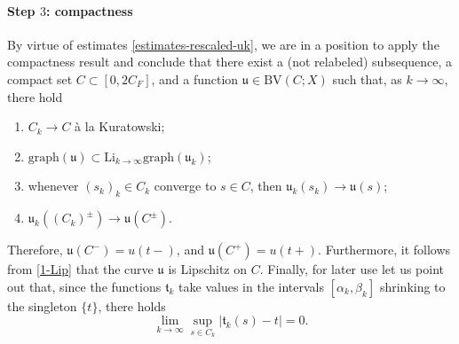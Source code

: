 \documentclass[a4paper,10pt,reqno]{amsart} %
\numberwithin{equation}{section}
\newcommand{\Xs}{X}
\newcommand{\BV}{\mathrm{BV}}
\newcommand{\lli}[2]{{#1}({#2}{-})}
\newcommand{\rli}[2]{{#1}({#2}{+})}
\newcommand{\ninvresc}[1]{\mathfrak{t}_{#1}}
\newcommand{\invcur}[1]{\mathfrak{u}_{#1}}
\newcommand{\invcu}{\mathfrak{u}}
\newcommand{\RRRN}{\color{blue}}
\begin{document}
\paragraph{\bf Step $3$: compactness} By virtue of estimates \eqref{estimates-rescaled-uk}, we are in a position to apply the 
compactness result  \cite[Thm.\ 5.4]{SavMin16} and conclude that 
 there exist a (not relabeled) subsequence,  a compact set   $C\subset [0,2C_F]$,
  and a function $\invcu \in \BV(C;\Xs)$ such that, as $k\to\infty$, there hold
\begin{enumerate}
\item $C_{k} \to C$ \`a la Kuratowski;
\item $\mathrm{graph}(\invcu)\subset \mathrm{Li}_{k\to\infty} \mathrm{graph}(\invcur {k})$;
\item whenever $(s_{k})_k  \in C_{k}$ converge to $s\in C$, then $\invcur {k}(s_{k})\to \invcu(s)$;
\item 
$\invcur {k}((C_{k})^\pm )\to \invcu(C^\pm)$.
\end{enumerate}
Therefore, $\invcu(C^-) =  \lli u t$, and $\invcu(C^+) = \rli u t$. Furthermore, it follows from \eqref{1-Lip} that the curve   $\invcu $   is Lipschitz on $C$.
 Finally, for later use  let us point out that, since 
  the functions $\ninvresc k$ take values in the intervals $[\alpha_k,\beta_k]$ shrinking to the singleton $\{t\}$, there holds 
\begin{equation}
\label{singleton}
\lim_{k\to\infty}  \sup_{s\in C_k} | \ninvresc k(s)- t | =0. 
\end{equation} 
\end{document}
